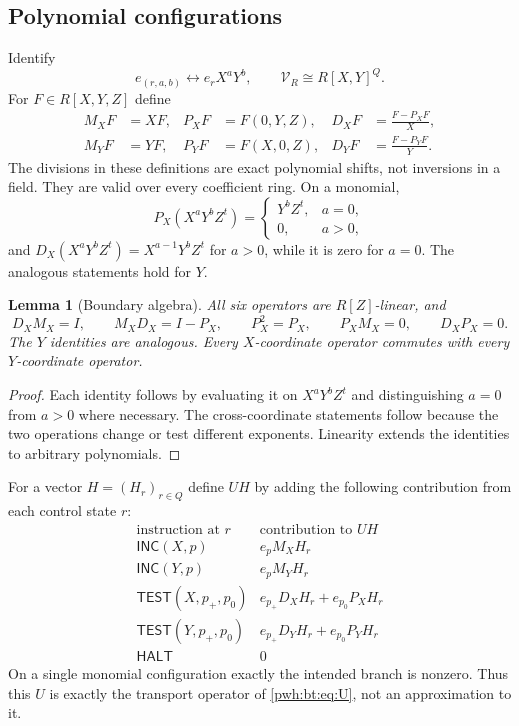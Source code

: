 \documentclass[11pt,letterpaper]{article}
\numberwithin{equation}{section}
\newtheorem{lemma}[theorem]{Lemma}
\theoremstyle{definition}
\newcommand{\inc}{\mathsf{INC}}
\newcommand{\test}{\mathsf{TEST}}
\newcommand{\halt}{\mathsf{HALT}}
\newcommand{\V}{\mathcal V}
\begin{document}
\subsection{Polynomial configurations}
Identify
\[
 e_{(r,a,b)}\longleftrightarrow e_rX^aY^b,
 \qquad \V_R\cong R[X,Y]^Q.
\]
For $F\in R[X,Y,Z]$ define
\begin{align}
 M_XF&=XF,& P_XF&=F(0,Y,Z),&
 D_XF&=\frac{F-P_XF}{X},\label{pwh:bt:eq:boundaryX}\\
 M_YF&=YF,& P_YF&=F(X,0,Z),&
 D_YF&=\frac{F-P_YF}{Y}.\label{pwh:bt:eq:boundaryY}
\end{align}
The divisions in these definitions are exact polynomial shifts, not
inversions in a field. They are valid over every coefficient ring.
On a monomial,
\[
 P_X(X^aY^bZ^t)=\begin{cases}Y^bZ^t,&a=0,\\0,&a>0,\end{cases}
\]
and $D_X(X^aY^bZ^t)=X^{a-1}Y^bZ^t$ for $a>0$, while it is zero
for $a=0$. The analogous statements hold for $Y$.

\begin{lemma}[Boundary algebra]\label{pwh:bt:lem:boundary}
All six operators are $R[Z]$-linear, and
\[
 D_XM_X=I,\qquad M_XD_X=I-P_X,\qquad
 P_X^2=P_X,\qquad P_XM_X=0,\qquad D_XP_X=0.
\]
The $Y$ identities are analogous. Every $X$-coordinate operator commutes
with every $Y$-coordinate operator.
\end{lemma}
\begin{proof}
Each identity follows by evaluating it on $X^aY^bZ^t$ and distinguishing
$a=0$ from $a>0$ where necessary. The cross-coordinate statements follow
because the two operations change or test different exponents. Linearity
extends the identities to arbitrary polynomials.
\end{proof}

For a vector $H=(H_r)_{r\in Q}$ define $UH$ by adding the following
contribution from each control state $r$:
\begin{equation}\label{pwh:bt:eq:contribution}
\begin{array}{c|c}
\text{instruction at }r & \text{contribution to }UH\\ \hline
\inc(X,p) & e_p M_XH_r\\
\inc(Y,p) & e_p M_YH_r\\
\test(X,p_+,p_0) & e_{p_+}D_XH_r+e_{p_0}P_XH_r\\
\test(Y,p_+,p_0) & e_{p_+}D_YH_r+e_{p_0}P_YH_r\\
\halt & 0
\end{array}
\end{equation}
On a single monomial configuration exactly the intended branch is
nonzero. Thus this $U$ is exactly the transport operator of
\eqref{pwh:bt:eq:U}, not an approximation to it.
\end{document}
